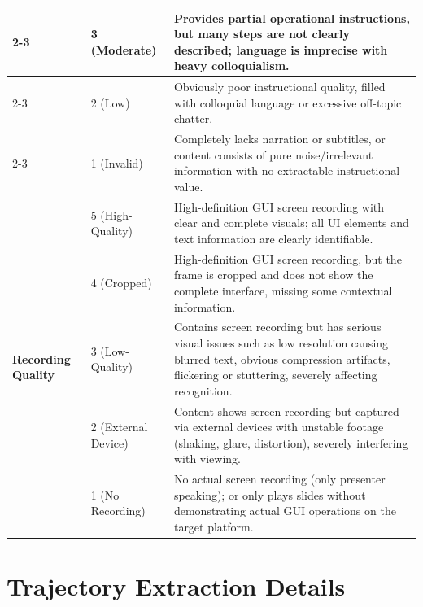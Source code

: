 \documentclass{article}
\theoremstyle{plain}
\theoremstyle{definition}
\theoremstyle{remark}
\begin{document}
\begin{table}[htbp]
\begin{tabular}{llp{10cm}}
\cmidrule{2-3}
& 3 (Moderate) & Provides partial operational instructions, but many steps are not clearly described; language is imprecise with heavy colloquialism. \\
\cmidrule{2-3}
& 2 (Low) & Obviously poor instructional quality, filled with colloquial language or excessive off-topic chatter. \\
\cmidrule{2-3}
& 1 (Invalid) & Completely lacks narration or subtitles, or content consists of pure noise/irrelevant information with no extractable instructional value. \\
\midrule
\multirow{10}{*}{\textbf{Recording Quality}}
& 5 (High-Quality) & High-definition GUI screen recording with clear and complete visuals; all UI elements and text information are clearly identifiable. \\
\cmidrule{2-3}
& 4 (Cropped) & High-definition GUI screen recording, but the frame is cropped and does not show the complete interface, missing some contextual information. \\
\cmidrule{2-3}
& 3 (Low-Quality) & Contains screen recording but has serious visual issues such as low resolution causing blurred text, obvious compression artifacts, flickering or stuttering, severely affecting recognition. \\
\cmidrule{2-3}
& 2 (External Device) & Content shows screen recording but captured via external devices with unstable footage (shaking, glare, distortion), severely interfering with viewing. \\
\cmidrule{2-3}
& 1 (No Recording) & No actual screen recording (only presenter speaking); or only plays slides without demonstrating actual GUI operations on the target platform. \\
\bottomrule
\end{tabular}
\end{table}

\section{Trajectory Extraction Details}
\label{sec: trajectory extraction}
\end{document}
